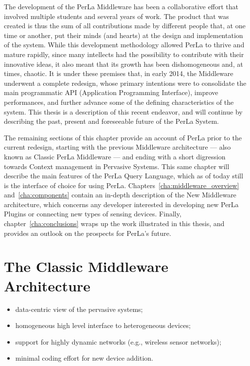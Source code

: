 The development of the PerLa Middleware has been a collaborative effort that
involved multiple students and several years of work. The product that was
created is thus the sum of all contributions made by different people that, at
one time or another, put their minds (and hearts) at the design and
implementation of the system. While this development methodology allowed PerLa
to thrive and mature rapidly, since many intellects had the possibility to
contribute with their innovative ideas, it also meant that its growth has been
dishomogeneous and, at times, chaotic. It is under these premises that, in
early 2014, the Middleware underwent a complete redesign, whose primary
intentions were to consolidate the main programmatic API (Application
Programming Interface), improve performances, and further advance some of the
defining characteristics of the system. This thesis is a description of this
recent endeavor, and will continue by describing the past, present and
foreseeable future of the PerLa System.

The remaining sections of this chapter provide an account of PerLa prior to the
current redesign, starting with the previous Middleware architecture --- also
known as Classic PerLa Middleware --- and ending with a short digression
towards Context management in Pervasive Systems. This same chapter will
describe the main features of the PerLa Query Language, which as of today still
is the interface of choice for using PerLa.
Chapters~\ref{cha:middleware_overview} and~\ref{cha:components} contain an
in-depth description of the New Middleware architecture, which concerns any
developer interested in developing new PerLa Plugins or connecting new types of
sensing devices. Finally, chapter~\ref{cha:conclusions} wraps up the work
illustrated in this thesis, and provides an outlook on the prospects for
PerLa's future.


\section{The Classic Middleware Architecture}

\begin{itemize}

    \item data-centric view of the pervasive systems;

    \item homogeneous high level interface to heterogeneous
    devices;

    \item support for highly dynamic networks (e.g., wireless
    sensor networks);

    \item minimal coding effort for new device addition.

\end{itemize}

